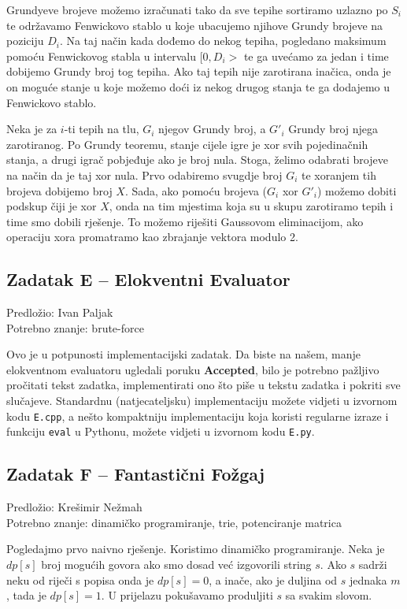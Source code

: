 \documentclass[a4paper]{article}
\begin{document}
Grundyeve brojeve možemo izračunati tako da sve tepihe sortiramo uzlazno po $S_i$
te održavamo Fenwickovo stablo u koje ubacujemo njihove Grundy brojeve na
poziciju $D_i$.  Na taj način kada dođemo do nekog tepiha, pogledano maksimum
pomoću Fenwickovog stabla u intervalu $[0, D_i>$ te ga uvećamo za jedan i time
dobijemo Grundy broj tog tepiha. Ako taj tepih nije zarotirana inačica, onda je
on moguće stanje u koje možemo doći iz nekog drugog stanja te ga dodajemo u
Fenwickovo stablo.

Neka je za $i$-ti tepih na tlu, $G_i$ njegov Grundy broj, a $G'_i$ Grundy broj
njega zarotiranog. Po Grundy teoremu, stanje cijele igre je xor svih
pojedinačnih stanja, a drugi igrač pobjeđuje ako je broj nula.
Stoga, želimo odabrati brojeve na način da je taj xor nula. Prvo odabiremo
svugdje broj $G_i$ te xoranjem tih brojeva dobijemo broj $X$. Sada, ako pomoću
brojeva ($G_i$ xor $G'_i$) možemo dobiti podskup čiji je xor $X$, onda na tim
mjestima koja su u skupu zarotiramo tepih i time smo dobili rješenje. To možemo
riješiti Gaussovom eliminacijom, ako operaciju xora promatramo kao zbrajanje
vektora modulo 2.

\subsection*{Zadatak E -- Elokventni Evaluator}
\textsf{Predložio: Ivan Paljak}\\
\textsf{Potrebno znanje: brute-force}

Ovo je u potpunosti implementacijski zadatak. Da biste na našem,
manje elokventnom evaluatoru ugledali poruku {\color{ForestGreen} \textbf{Accepted}},
bilo je potrebno pažljivo pročitati tekst zadatka, implementirati ono što piše u
tekstu zadatka i pokriti sve slučajeve. Standardnu (natjecateljsku)
implementaciju možete vidjeti u izvornom kodu \texttt{E.cpp}, a nešto
kompaktniju implementaciju koja koristi regularne izraze i funkciju \texttt{eval}
u Pythonu, možete vidjeti u izvornom kodu \texttt{E.py}.

\clearpage

\subsection*{Zadatak F -- Fantastični Fožgaj}
\textsf{Predložio: Krešimir Nežmah}\\
\textsf{Potrebno znanje: dinamičko programiranje, trie, potenciranje matrica}

Pogledajmo prvo naivno rješenje. Koristimo dinamičko programiranje.
Neka je $dp[s]$ broj mogućih govora ako smo dosad već izgovorili string $s$.
Ako $s$ sadrži neku od riječi s popisa onda je $dp[s] = 0$, a inače, ako je
duljina od $s$ jednaka $m$, tada je $dp[s] = 1$. U prijelazu pokušavamo
produljiti $s$ sa svakim slovom.
\end{document}
